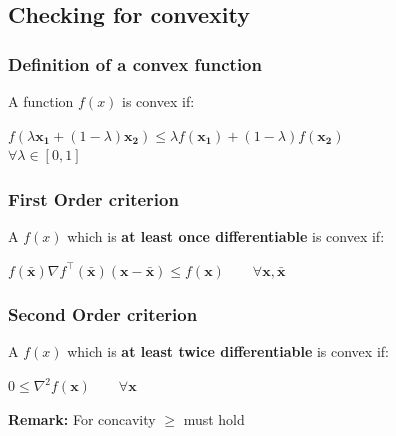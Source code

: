 \documentclass[english]{latex4ei/latex4ei_sheet}
\begin{document}
\begin{sectionbox}
	\subsection{Checking for convexity}
	\subsubsection{Definition of a convex function}
	\vspace{0.3em}
	A function $f(x)$ is convex if:
	\begin{center}
		$f(\lambda \bm{x_1} + (1-\lambda)\bm{x_2}) \bm{\leq} \lambda f(\bm{x_1}) + (1-\lambda) f(\bm{x_2})$ \\
		\vspace{0.2em}
		$\forall \lambda \in [0, 1]$
	\end{center}
	\vspace{0.5em}
	\subsubsection{First Order criterion}
	\vspace{0.3em}
	A $f(x)$ which is \textbf{at least once differentiable} is convex if:
	\begin{center}
		$f(\bar{\bm{x}}) \nabla f^\intercal(\bar{\bm{x}})(\bm{x} - \bar{\bm{x}}) \bm{\leq} f(\bm{x}) \qquad \forall \bm{x}, \bar{\bm{x}}$
	\end{center}
	\vspace{0.5em}
	\subsubsection{Second Order criterion}
	\vspace{0.3em}
	A $f(x)$ which is \textbf{at least twice differentiable} is convex if:
	\begin{center}
		$0 \bm{\leq} \nabla^2f(\bm{x}) \qquad \forall \bm{x}$
	\end{center}
	\vspace{0.5em}
	\textbf{Remark:} For concavity $\bm{\geq}$ must hold
\end{sectionbox}
\end{document}
